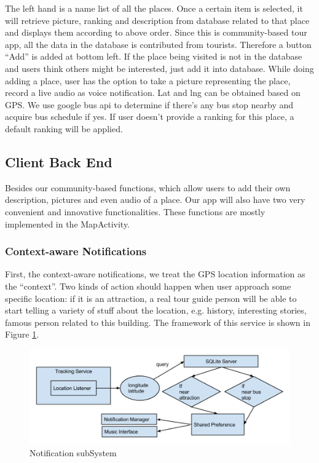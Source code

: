 \documentclass{article}
\begin{document}
The left hand is a name list of all the places. Once a certain item is selected, it will retrieve picture, ranking and description from database related to that place and displays them according to above order. Since this is community-based tour app, all the data in the database is contributed from tourists. Therefore a button “Add” is added at bottom left. If the place being visited is not in the database and users think others might be interested, just add it into database. While doing adding a place, user has the option to take a picture representing the place, record a live audio as voice notification. Lat and lng can be obtained based on GPS. We use google bus api to determine if there’s any bus stop nearby and acquire bus schedule if yes. If user doesn’t provide a ranking for this place, a default ranking will be applied.

\subsection{Client Back End}

Besides our community-based functions, which allow users to add their own description, pictures and even audio of a place. Our app will also have two very convenient and innovative functionalities. These functions are mostly implemented in the MapActivity.

\subsubsection{Context-aware Notifications}
First, the context-aware notifications, we treat the GPS location information as the “context”. Two kinds of action should happen when user approach some specific location: if it is an attraction, a real tour guide person will be able to start telling a variety of stuff about the location, e.g. history, interesting stories, famous person related to this building. The framework of this service is shown in Figure \ref{F:notifysys}.

\begin{figure}[h!]   
\centering
\includegraphics[width = \textwidth]{figures/NotificationGraph.jpg}
\caption{Notification subSystem}
\label{F:notifysys}
\end{figure}
\end{document}
